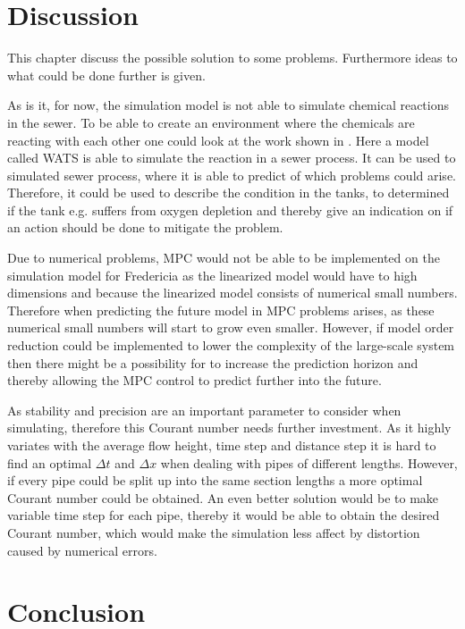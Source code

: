 \chapter{Discussion}\label{ch:discussion}
This chapter discuss the possible solution to some problems. Furthermore ideas to what could be done further is given. 

As is it, for now, the simulation model is not able to simulate chemical reactions in the sewer. To be able to create an environment where the chemicals are reacting with each other one could look at the work shown in \cite{Sewer_processes}. Here a model called WATS is able to simulate the reaction in a sewer process. It can be used to simulated sewer process, where it is able to predict of which problems could arise. Therefore, it could be used to describe the condition in the tanks, to determined if the tank e.g. suffers from oxygen depletion and thereby give an indication on if an action should be done to mitigate the problem.   

Due to numerical problems, MPC would not be able to be implemented on the simulation model for Fredericia as the linearized model would have to high dimensions and because the linearized model consists of numerical small numbers. Therefore when predicting the future model in MPC problems arises, as these numerical small numbers will start to grow even smaller. However, if model order reduction could be implemented to lower the complexity of the large-scale system then there might be a possibility for to increase the prediction horizon and thereby allowing the MPC control to predict further into the future. 

As stability and precision are an important parameter to consider when simulating, therefore this Courant number needs further investment. As it highly variates with the average flow height, time step and distance step it is hard to find an optimal $\Delta t$ and $\Delta x$ when dealing with pipes of different lengths. However, if every pipe could be split up into the same section lengths a more optimal Courant number could be obtained. An even better solution would be to make variable time step for each pipe, thereby it would be able to obtain the desired Courant number, which would make the simulation less affect by distortion caused by numerical errors. 

\chapter{Conclusion}\label{ch:conclusion}

